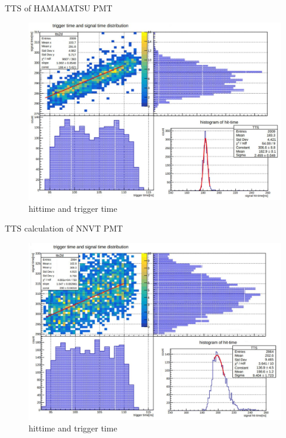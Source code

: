 \begin{frame}{TTS of HAMAMATSU PMT}
\begin{figure}
\centering
\includegraphics[width=.8\textwidth]{figures/hamtts.JPG} %
\caption{hittime and trigger time}
\end{figure}
\end{frame}
\begin{frame}{TTS calculation of NNVT PMT}
\begin{figure}
\centering
\includegraphics[width=.8\textwidth]{figures/mcptts.JPG} %
\caption{hittime and trigger time}
\end{figure}
\end{frame}
